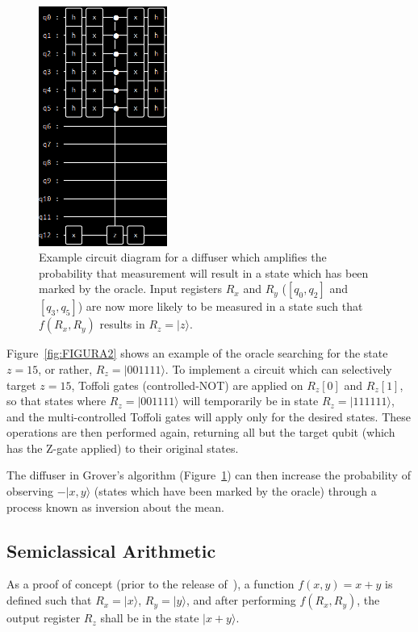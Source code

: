 \documentclass[twocolumn]{cinc}
\begin{document}
  \begin{figure}[!h]
  \centering
  \includegraphics[width=4.2cm]{diffuse.png}
  \caption{Example circuit diagram for a diffuser which amplifies the probability that
  measurement will result in a state which has been marked by the oracle.
  Input registers $R_x$ and $R_y$ ($[q_0,q_2]$ and $[q_3,q_5]$) are now 
  more likely to be measured in a state such that $f(R_x,R_y)$ results in $R_z=|z\rangle$.}\label{fig:FIGURA3}
  \end{figure}

  Figure~\ref{fig:FIGURA2} shows an example of the oracle searching for the state $z=15$,
  or rather, $R_z=|001111\rangle$. To implement a circuit which can selectively target
  $z=15$, Toffoli gates (controlled-NOT) are applied on $R_z[0]$ and $R_z[1]$, 
  so that states where $R_z=|001111\rangle$ will temporarily be in
  state $R_z=|111111\rangle$, and the multi-controlled Toffoli gates\cite{multi_toffoli}
  will apply only for the desired states. These operations are then performed again,
  returning all but the target qubit (which has the Z-gate applied) to their original
  states.

  The diffuser in Grover's algorithm (Figure~\ref{fig:FIGURA3}) can then increase the 
  probability of observing $-|x,y\rangle$ (states which have been marked by the oracle) 
  through a process known as inversion about the mean.

  \subsection{Semiclassical Arithmetic} 

  As a proof of concept (prior to the release of~\cite{quantum_factoring}),
  a function $f(x,y)=x+y$ is defined such that $R_x=|x\rangle$, $R_y=|y\rangle$,
  and after performing $f(R_x,R_y)$, the output register $R_z$ shall be in the
  state $|x+y\rangle$.
  
\end{document}
